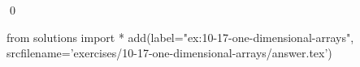 
\begin{ex}
  \label{ex:10-17-one-dimensional-arrays}
  
  \qed
\end{ex}
\begin{python0}
from solutions import *
add(label="ex:10-17-one-dimensional-arrays",
    srcfilename='exercises/10-17-one-dimensional-arrays/answer.tex')
\end{python0}

